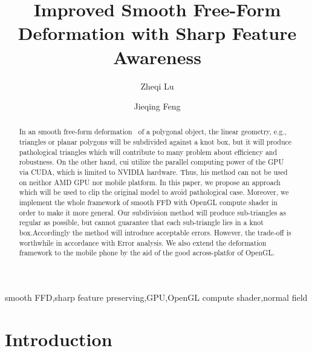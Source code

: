 \documentclass[3p]{elsarticle}
\begin{document}
\begin{frontmatter}

\title{Improved Smooth Free-Form Deformation with Sharp Feature Awareness}

\author{Zheqi Lu}

\author{Jieqing Feng}

\address{State Key Lab of CAD\&CG, Zhejiang University, China}

\begin{abstract}
In an smooth free-form deformation~\cite{Cui15} of a polygonal object, the linear geometry, e.g., triangles or planar polygons will be subdivided against a knot box, but it will produce pathological triangles which will contribute to many problem about efficiency and robustness. On the other hand, cui utilize the parallel computing power of the GPU via CUDA, which is limited to NVIDIA hardware. Thus, his method can not be used on neithor AMD GPU nor mobile platform. In this paper, we propose an approach which will be used to clip the original model to avoid pathological case. Moreover, we implement the whole framework of smooth FFD with OpenGL compute shader in order to make it more general. Our subdivision method will produce sub-triangles as regular as possible, but cannot guarantee that each sub-triangle lies in a knot box.Accordingly the method will introduce acceptable errors. However, the trade-off is worthwhile in accordance with Error analysis. We also extend the deformation framework to the mobile phone by the aid of the good across-platfor of OpenGL.
\end{abstract}

\begin{keyword}
smooth FFD\sep sharp feature preserving\sep GPU\sep OpenGL compute shader\sep normal field
\end{keyword}

\end{frontmatter}

\section{Introduction}
\end{document}
